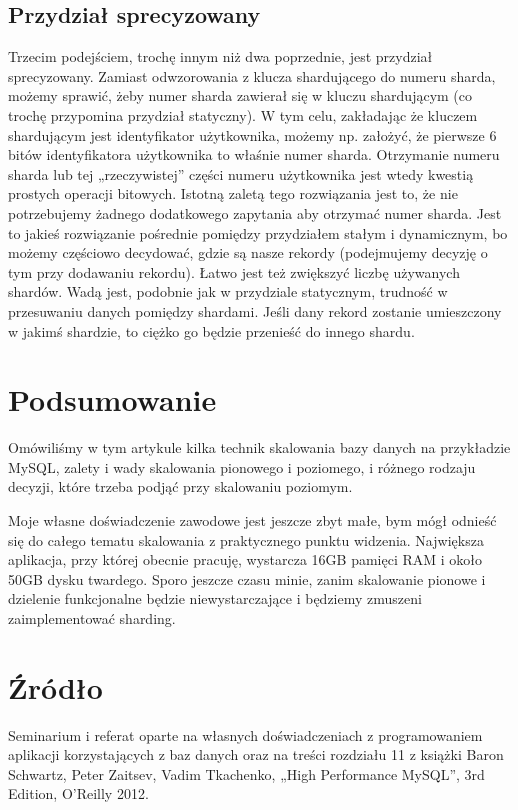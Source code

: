 \documentclass[a4paper,12pt]{article}
\begin{document}
\subsection{Przydział sprecyzowany}

Trzecim podejściem, trochę innym niż dwa poprzednie, jest przydział sprecyzowany. Zamiast odwzorowania z klucza shardującego do numeru sharda, możemy sprawić, żeby numer sharda zawierał się w kluczu shardującym (co trochę przypomina przydział statyczny). W tym celu, zakładając że kluczem shardującym jest identyfikator użytkownika, możemy np. założyć, że pierwsze 6 bitów identyfikatora użytkownika to właśnie numer sharda. Otrzymanie numeru sharda lub tej „rzeczywistej” części numeru użytkownika jest wtedy kwestią prostych operacji bitowych. Istotną zaletą tego rozwiązania jest to, że nie potrzebujemy żadnego dodatkowego zapytania aby otrzymać numer sharda. Jest to jakieś rozwiązanie pośrednie pomiędzy przydziałem stałym i dynamicznym, bo możemy częściowo decydować, gdzie są nasze rekordy (podejmujemy decyzję o tym przy dodawaniu rekordu). Łatwo jest też zwiększyć liczbę używanych shardów. Wadą jest, podobnie jak w przydziale statycznym, trudność w przesuwaniu danych pomiędzy shardami. Jeśli dany rekord zostanie umieszczony w jakimś shardzie, to ciężko go będzie przenieść do innego shardu.

\section{Podsumowanie}

Omówiliśmy w tym artykule kilka technik skalowania bazy danych na przykładzie MySQL, zalety i wady skalowania pionowego i poziomego, i różnego rodzaju decyzji, które trzeba podjąć przy skalowaniu poziomym.

Moje własne doświadczenie zawodowe jest jeszcze zbyt małe, bym mógł odnieść się do całego tematu skalowania z praktycznego punktu widzenia. Największa aplikacja, przy której obecnie pracuję, wystarcza 16GB pamięci RAM i około 50GB dysku twardego. Sporo jeszcze czasu minie, zanim skalowanie pionowe i dzielenie funkcjonalne będzie niewystarczające i będziemy zmuszeni zaimplementować sharding.

\section{Źródło}

Seminarium i referat oparte na własnych doświadczeniach z programowaniem aplikacji korzystających z baz danych oraz na treści rozdziału 11 z książki Baron Schwartz, Peter Zaitsev, Vadim Tkachenko, „High Performance MySQL”, 3rd Edition, O'Reilly 2012.
\end{document}
